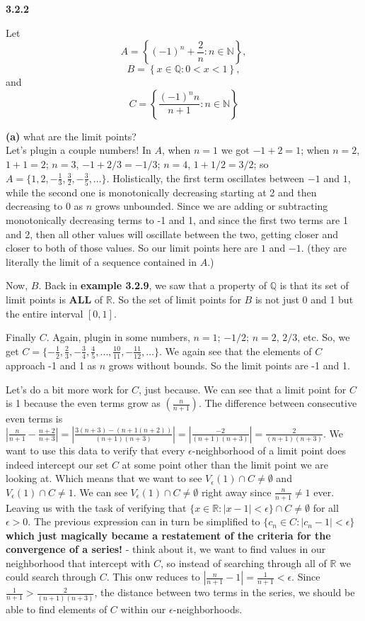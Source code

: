 \textbf{3.2.2}

Let
$$
A = \left\{ (-1)^n + \frac{2}{n} : n\in\mathbb{N} \right\},
$$
$$
B = \left\{ x \in\mathbb{Q} : 0 < x < 1 \right\},
$$
and
$$
C = \left\{ \frac{(-1)^n n}{n+1} : n\in\mathbb{N} \right\}
$$

\textbf{(a)} what are the limit points?
\\

Let's plugin a couple numbers!
In $A$, when $n=1$ we got $-1 + 2 = 1$; when $n=2$, $1 + 1 = 2$; $n=3$, $-1 + 2/3 = -1/3$; $n=4$, $1 + 1/2 = 3/2$;
so $A = \{ 1, 2, -\frac{1}{3}, \frac{3}{2}, -\frac{3}{5}, \ldots \}$.
Holistically, the first term oscillates between $-1$ and $1$, while the second one is monotonically decreasing
starting at 2 and then decreasing to 0 as $n$ grows unbounded.
Since we are adding or subtracting monotonically decreasing terms to -1 and 1, and since the first two terms are 1 and 2,
then all other values will oscillate between the two, getting closer and closer to both of those values.
So our limit points here are $1$ and $-1$. (they are literally the limit of a sequence contained in $A$.)

Now, $B$.
Back in \textbf{example 3.2.9}, we saw that a property of $\mathbb{Q}$ is that its set of limit points is \textbf{ALL}
of $\mathbb{R}$.
So the set of limit points for $B$ is not just 0 and 1 but the entire interval $[0,1]$.

Finally $C$. Again, plugin in some numbers, $n=1$; $-1/2$; $n=2$, $2/3$, etc.
So, we get $C = \{-\frac{1}{2}, \frac{2}{3}, -\frac{3}{4}, \frac{4}{5}, \ldots, \frac{10}{11}, -\frac{11}{12}, \ldots \}$.
We again see that the elements of $C$ approach -1 and 1 as $n$ grows without bounds.
So the limit points are -1 and 1.

Let's do a bit more work for $C$, just because.
We can see that a limit point for $C$ is 1 because the even terms grow as $(\frac{n}{n+1})$.
The difference between consecutive even terms is
$\left|\frac{n}{n+1} - \frac{n+2}{n+3}\right| = \left|\frac{3(n+3) - (n+1(n+2))}{(n+1)(n+3)}\right| = \left|\frac{-2}{(n+1)(n+3)}\right| = \frac{2}{(n+1)(n+3)}$.
We want to use this data to verify that every $\epsilon$-neighborhood of a limit point does indeed intercept our set $C$
at some point other than the limit point we are looking at.
Which means that we want to see $V_{\epsilon} (1) \cap C \neq \emptyset$ and $V_{\epsilon} (1) \cap C \neq 1$.
We can see $V_{\epsilon} (1) \cap C \neq \emptyset$ right away since $\frac{n}{n+1} \neq 1$ ever.
Leaving us with the task of verifying that $\{ x\in\mathbb{R} : |x-1| < \epsilon \} \cap C \neq \emptyset$ for all $\epsilon > 0$.
The previous expression can in turn be simplified to $\{ c_n\in C : |c_n - 1| < \epsilon \}$
\textbf{which just magically became a restatement of the criteria for the convergence of a series!} -
think about it, we want to find values in our neighborhood that intercept with $C$, so instead of searching through all of $\mathbb{R}$
we could search through $C$.
This onw reduces to $\left| \frac{n}{n+1} - 1 \right| = \frac{1}{n+1} < \epsilon$.
Since $ \frac{1}{n+1} > \frac{2}{(n+1)(n+3)}$, the distance between two terms in the series, we should be able to
find elements of $C$ within our $\epsilon$-neighborhoods.

